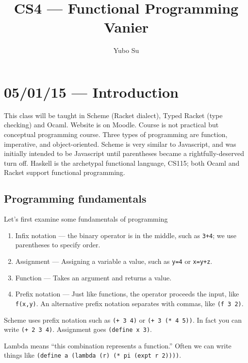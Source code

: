 \documentclass[10pt]{report}
\begin{document}
\title{CS4 --- Functional Programming\\ Vanier}
\author{Yubo Su}
\date{}

\maketitle
\tableofcontents

\chapter{05/01/15 --- Introduction}

This class will be taught in Scheme (Racket dialect), Typed Racket (type checking) and Ocaml. Website is on Moodle. Course is not practical but conceptual programming course. Three types of programming are function, imperative, and object-oriented. Scheme is very similar to Javascript, and was initially intended to be Javascript until parentheses became a rightfully-deserved turn off. Haskell is the archetypal functional language, CS115; both Ocaml and Racket support functional programming.

\section{Programming fundamentals}

Let's first examine some fundamentals of programming
\begin{enumerate}[1)]
    \item Infix notation --- the binary operator is in the middle, such as \texttt{3+4}; we use parentheses to specify order. 
    \item Assignment --- Assigning a variable a value, such as \texttt{y=4} or \texttt{x=y+z}.
    \item Function --- Takes an argument and returns a value.
    \item Prefix notation --- Just like functions, the operator proceeds the input, like \texttt{f(x,y)}. An alternative prefix notation separates with commas, like \texttt{(f 3 2)}.
\end{enumerate}

Scheme uses prefix notation such as \texttt{(+ 3 4)} or \texttt{(+ 3 (* 4 5))}. In fact you can write \texttt{(+ 2 3 4)}. Assignment goes \texttt{(define x 3)}.

Lambda means ``this combination represents a function.'' Often we can write things like \texttt{(define a (lambda (r) (* pi (expt r 2))))}.
\end{document}
